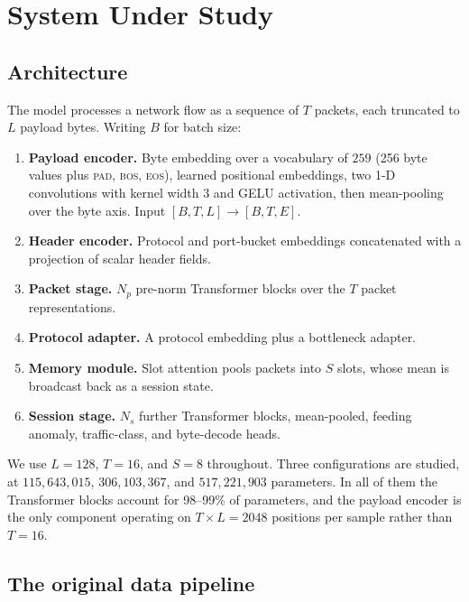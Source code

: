 \documentclass[11pt]{article}
\begin{document}
\section{System Under Study}
\label{sec:system}

\subsection{Architecture}

The model processes a network flow as a sequence of $T$ packets, each truncated
to $L$ payload bytes. Writing $B$ for batch size:

\begin{enumerate}
  \item \textbf{Payload encoder.} Byte embedding over a vocabulary of $259$
  (256 byte values plus \textsc{pad}, \textsc{bos}, \textsc{eos}), learned
  positional embeddings, two 1-D convolutions with kernel width 3 and GELU
  activation, then mean-pooling over the byte axis. Input
  $[B, T, L] \to [B, T, E]$.
  \item \textbf{Header encoder.} Protocol and port-bucket embeddings
  concatenated with a projection of scalar header fields.
  \item \textbf{Packet stage.} $N_p$ pre-norm Transformer blocks
  \citep{vaswani2017attention} over the $T$ packet representations.
  \item \textbf{Protocol adapter.} A protocol embedding plus a bottleneck
  adapter.
  \item \textbf{Memory module.} Slot attention \citep{locatello2020object} pools
  packets into $S$ slots, whose mean is broadcast back as a session state.
  \item \textbf{Session stage.} $N_s$ further Transformer blocks, mean-pooled,
  feeding anomaly, traffic-class, and byte-decode heads.
\end{enumerate}

We use $L = 128$, $T = 16$, and $S = 8$ throughout. Three configurations are
studied, at $115{,}643{,}015$, $306{,}103{,}367$, and $517{,}221{,}903$
parameters. In all of them the Transformer blocks account for 98--99\% of
parameters, and the payload encoder is the only component operating on
$T \times L = 2048$ positions per sample rather than $T = 16$.

\subsection{The original data pipeline}
\end{document}
